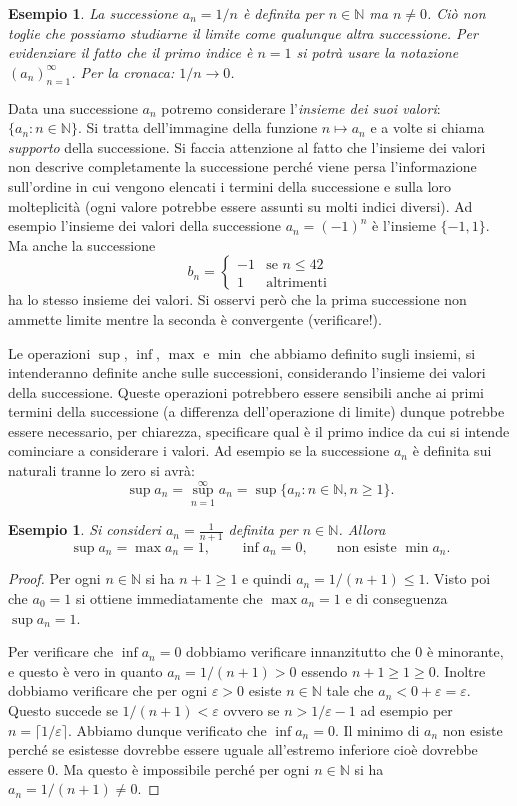 \documentclass[italian,a4paper,oneside,headinclude]{scrbook}
\newcommand{\myemph}[1]{\emph{#1}\marginpar{#1}}
\newcommand{\eps}{\varepsilon}
\newcommand{\NN}{\mathbb N}
\newtheorem{example}[theorem]{Esempio}
\begin{document}
\begin{example}
La successione $a_n = 1/n$ è definita per $n\in \NN$ ma $n\neq 0$.
Ciò non toglie che possiamo studiarne il limite come qualunque altra
successione. Per evidenziare il fatto che il primo indice è $n=1$
si potrà usare la notazione $(a_n)_{n=1}^\infty$.
Per la cronaca: $1/n \to 0$.
\end{example}

Data una successione $a_n$ potremo considerare l'\emph{insieme
dei suoi valori}: $\{a_n\colon n\in \NN\}$.
Si tratta dell'immagine della funzione $n\mapsto a_n$
e a volte si chiama \myemph{supporto} della successione.
Si faccia attenzione al fatto che l'insieme dei valori
non descrive completamente la successione perché
viene persa l'informazione sull'ordine in cui vengono elencati
i termini della successione e sulla loro molteplicità (ogni valore
potrebbe essere assunti su molti indici diversi). Ad esempio
l'insieme dei valori della successione $a_n = (-1)^n$ è l'insieme $\{-1, 1\}$. Ma anche la successione
\[
 b_n = \begin{cases}
   -1 & \text{se $n\le 42$}\\
   1  & \text{altrimenti}
 \end{cases}
\]
ha lo stesso insieme dei valori. Si osservi però
che la prima successione non ammette limite mentre la seconda
è convergente (verificare!).

Le operazioni $\sup$, $\inf$, $\max$ e $\min$ che abbiamo
definito sugli insiemi, si intenderanno definite anche
sulle successioni, considerando l'insieme dei valori della successione.
Queste operazioni potrebbero essere sensibili anche ai primi termini della
successione (a differenza dell'operazione di limite) dunque potrebbe
essere necessario, per chiarezza, specificare qual è il primo indice
da cui si intende cominciare a considerare i valori. Ad esempio
se la successione $a_n$ è definita sui naturali tranne lo zero
si avrà:
\[
  \sup a_n = \sup_{n=1}^\infty a_n = \sup\{a_n \colon n \in \NN, n \ge 1\}.
\]

\begin{example}
Si consideri $a_n = \frac{1}{n+1}$ definita per $n\in \NN$.
Allora
\[
  \sup a_n = \max a_n = 1, \qquad
  \inf a_n = 0, \qquad \text{non esiste }\min a_n.
\]
\end{example}
\begin{proof}
Per ogni $n \in \NN$ si ha $n+1\ge 1$ e quindi $a_n = 1/(n+1) \le 1$.
Visto poi che $a_0 = 1$ si ottiene immediatamente che $\max a_n = 1$
e di conseguenza $\sup a_n = 1$.

Per verificare che $\inf a_n = 0$ dobbiamo verificare innanzitutto
che $0$ è minorante, e questo è vero in quanto $a_n = 1/(n+1)> 0$ essendo $n+1\ge 1 \ge 0$.
Inoltre dobbiamo verificare che per ogni $\eps >0$ esiste $n\in \NN$ tale
che $a_n < 0 + \eps = \eps$. Questo succede se $1/(n+1) < \eps$ ovvero
se $n > 1/\eps -1$ ad esempio per $n=\lceil 1/\eps\rceil$.
Abbiamo dunque verificato che $\inf a_n = 0$.
Il minimo di $a_n$ non esiste perché se esistesse dovrebbe essere uguale
all'estremo inferiore cioè dovrebbe essere $0$. Ma questo è impossibile
perché per ogni $n\in \NN$ si ha $a_n = 1/(n+1)\neq 0$.
\end{proof}
\end{document}
